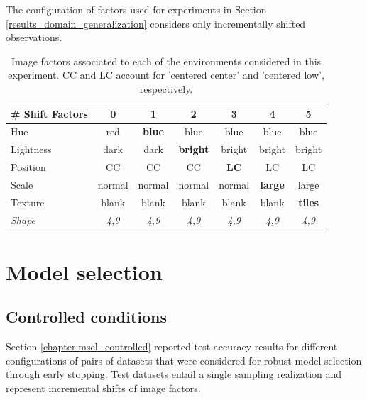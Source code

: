 \begin{definition}
    The configuration of factors used for experiments in Section \ref{results_domain_generalization}
    considers only incrementally shifted observations.

    \begin{table}[H]
        \centering
        \begin{tabular}{l|c|c|c|c|c|c}
        \# Shift Factors & 0 & 1 & 2 & 3 & 4 & 5 \\
        \midrule
        Hue & red & \textbf{blue} & blue & blue & blue & blue \\
        Lightness & dark & dark & \textbf{bright} & bright & bright & bright \\
        Position  & CC & CC & CC & \textbf{LC} & LC & LC \\
        Scale  & normal & normal & normal & normal & \textbf{large} & large \\
        Texture & blank & blank & blank & blank & blank & \textbf{tiles} \\
        \textit{Shape} & \textit{4,9} &  \textit{4,9} &  \textit{4,9} & \textit{4,9} & \textit{4,9} & \textit{4,9} \\
        \bottomrule
        \end{tabular}
        \caption{
        Image factors associated to each of the environments considered in this experiment. CC and LC account
        for 'centered center' and 'centered low', respectively.
        }
    \end{table}
\end{definition}

\section{Model selection}

\subsection{Controlled conditions}

Section \ref{chapter:msel_controlled} reported test accuracy results for different configurations of 
pairs of datasets that were considered for robust model selection through early stopping. Test datasets entail
a single sampling realization and represent incremental shifts of image factors.

